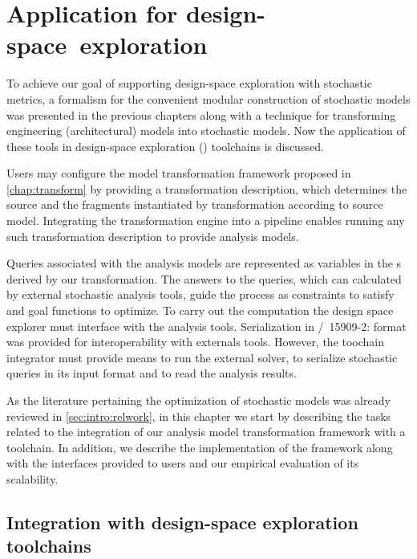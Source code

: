 \chapter{Application for design-space~exploration}
\label{chap:apply}

To achieve our goal of supporting design-space exploration with stochastic metrics, a formalism for the convenient modular construction of stochastic models was presented in the previous chapters along with a technique for transforming engineering (architectural) models into stochastic models. Now the application of these tools in design-space exploration () toolchains is discussed.

Users may configure the model transformation framework proposed in \cref{chap:transform} by providing a transformation description, which determines the source  and the  fragments instantiated by transformation according to source model. Integrating the transformation engine into a  pipeline enables running any such transformation description to provide analysis models.

Queries associated with the analysis models are represented as variables in the s derived by our transformation. The answers to the queries, which can calculated by external stochastic analysis tools, guide the  process as constraints to satisfy and goal functions to optimize. To carry out the computation the design space explorer must interface with the analysis tools. Serialization in /~15909-2:\citeyear{ISO1590922011}  format was provided for interoperability with externals tools. However, the toochain integrator must provide means to run the external solver, to serialize stochastic queries in its input format and to read the analysis results.

As the literature pertaining the optimization of stochastic models was already reviewed in \vref{sec:intro:relwork}, in this chapter we start by describing the tasks related to the integration of our analysis model transformation framework with a  toolchain. In addition, we describe the implementation of the framework along with the interfaces provided to users and our empirical evaluation of its scalability.

\section{Integration with design-space exploration toolchains}

